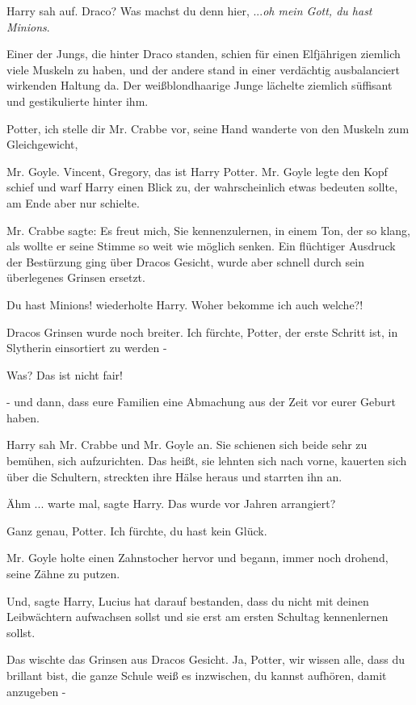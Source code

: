 Harry sah auf. \glqq{}Draco? Was machst du denn hier, ...\emph{oh mein Gott, du
hast Minions}.\grqq{}

Einer der Jungs, die hinter Draco standen, schien für einen Elfjährigen ziemlich
viele Muskeln zu haben, und der andere stand in einer verdächtig ausbalanciert
wirkenden Haltung da. Der weißblondhaarige Junge lächelte ziemlich süffisant und
gestikulierte hinter ihm.

\glqq{}Potter, ich stelle dir Mr. Crabbe vor\grqq{}, seine Hand wanderte von den
Muskeln zum Gleichgewicht,

\glqq{}Mr. Goyle. Vincent, Gregory, das ist Harry Potter.\grqq{} Mr. Goyle legte
den Kopf schief und warf Harry einen Blick zu, der wahrscheinlich etwas bedeuten
sollte, am Ende aber nur schielte.

Mr. Crabbe sagte: \glqq{}Es freut mich, Sie kennenzulernen\grqq{}, in einem Ton,
der so klang, als wollte er seine Stimme so weit wie möglich senken. Ein
flüchtiger Ausdruck der Bestürzung ging über Dracos Gesicht, wurde aber schnell
durch sein überlegenes Grinsen ersetzt.

\glqq{}Du hast Minions!\grqq{} wiederholte Harry. \glqq{}Woher bekomme ich auch
welche?!\grqq{}

Dracos Grinsen wurde noch breiter. \glqq{}Ich fürchte, Potter, der erste Schritt
ist, in Slytherin einsortiert zu werden -\grqq{}

\glqq{}Was? Das ist nicht fair!\grqq{}

\glqq{}- und dann, dass eure Familien eine Abmachung aus der Zeit vor eurer
Geburt haben.\grqq{}

Harry sah Mr. Crabbe und Mr. Goyle an. Sie schienen sich beide sehr zu bemühen,
sich aufzurichten. Das heißt, sie lehnten sich nach vorne, kauerten sich über
die Schultern, streckten ihre Hälse heraus und starrten ihn an.

\glqq{}Ähm ... warte mal\grqq{}, sagte Harry. \glqq{}Das wurde vor Jahren
arrangiert?\grqq{}

\glqq{}Ganz genau, Potter. Ich fürchte, du hast kein Glück.\grqq{}

Mr. Goyle holte einen Zahnstocher hervor und begann, immer noch drohend, seine
Zähne zu putzen.

\glqq{}Und\grqq{}, sagte Harry, \glqq{}Lucius hat darauf bestanden, dass du nicht
mit deinen Leibwächtern aufwachsen sollst und sie erst am ersten Schultag
kennenlernen sollst.\grqq{}

Das wischte das Grinsen aus Dracos Gesicht. \glqq{}Ja, Potter, wir wissen alle,
dass du brillant bist, die ganze Schule weiß es inzwischen, du kannst aufhören,
damit anzugeben -\grqq{}

